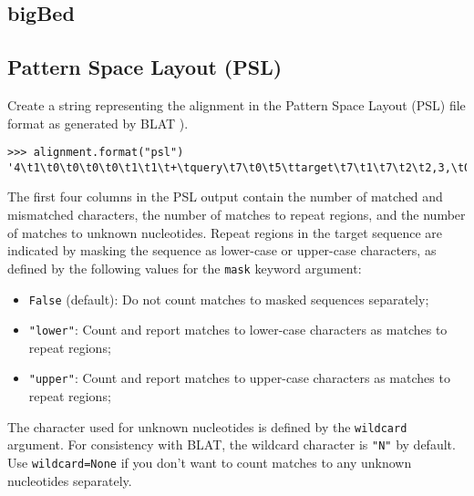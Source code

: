 \subsection{bigBed}
\label{subsec:align_bigbed}

\subsection{Pattern Space Layout (PSL)}
\label{subsec:align_psl}

Create a string representing the alignment in the Pattern Space Layout (PSL) file format as generated by BLAT \cite{kent2002}).
\begin{verbatim}
>>> alignment.format("psl")
'4\t1\t0\t0\t0\t0\t1\t1\t+\tquery\t7\t0\t5\ttarget\t7\t1\t7\t2\t2,3,\t0,2,\t1,4,\n'
\end{verbatim}
The first four columns in the PSL output contain the number of matched and mismatched characters, the number of matches to repeat regions, and the number of matches to unknown nucleotides.
Repeat regions in the target sequence are indicated by masking the sequence as lower-case or upper-case characters, as defined by the following values for the \verb+mask+ keyword argument:
\begin{itemize}
\item \verb+False+ (default): Do not count matches to masked sequences separately;
\item \verb+"lower"+: Count and report matches to lower-case characters as matches to repeat regions;
\item \verb+"upper"+: Count and report matches to upper-case characters as matches to repeat regions;
\end{itemize}
The character used for unknown nucleotides is defined by the \verb+wildcard+ argument. For consistency with BLAT, the wildcard character is \verb+"N"+ by default. Use \verb+wildcard=None+ if you don't want to count matches to any unknown nucleotides separately.
